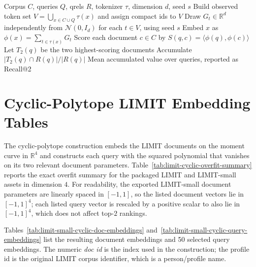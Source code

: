 \documentclass{article}
\begin{document}


\begin{algorithm}[H]
\caption{Label-unaware random token-sum retrieval}
\label{alg:random-token-limit}
\begin{algorithmic}[1]
\REQUIRE Corpus $C$, queries $Q$, qrels $R$, tokenizer $\tau$, dimension $d$, seed $s$
\STATE Build observed token set $V=\bigcup_{x\in C\cup Q}\tau(x)$ and assign compact ids to $V$
\STATE Draw $G_t\in\mathbb{R}^d$ independently from $\mathcal{N}(0,I_d)$ for each $t\in V$, using seed $s$
  \STATE Embed $x$ as $\phi(x)=\sum_{t\in\tau(x)}G_t$
\ENDFOR
{}
  \STATE Score each document $c\in C$ by $S(q,c)=\langle \phi(q),\phi(c)\rangle$
  \STATE Let $T_2(q)$ be the two highest-scoring documents
  \STATE Accumulate $\left|T_2(q)\cap R(q)\right|/\left|R(q)\right|$
\ENDFOR
\ENSURE Mean accumulated value over queries, reported as Recall@2
\end{algorithmic}
\end{algorithm}

\begin{table}[H]
  \centering
  \small
  \caption{Full random token-sum LIMIT Recall@2 grid used in
  Figure~\ref{fig:limit-retrieval}.}
  \label{tab:limit-random-token-grid}
  
\end{table}

\clearpage

\section{Cyclic-Polytope LIMIT Embedding Tables}\label{app:cyclic-limit}

The cyclic-polytope construction embeds the LIMIT documents on the
moment curve in $\mathbb{R}^4$ and constructs each query with the
squared polynomial that vanishes on its two relevant document
parameters. Table~\ref{tab:limit-cyclic-overfit-summary} reports the
exact overfit summary for the packaged LIMIT and LIMIT-small assets in
dimension $4$. For readability, the exported LIMIT-small document
parameters are linearly spaced in $[-1,1]$, so the listed document
vectors lie in $[-1,1]^4$; each listed query vector is rescaled by a
positive scalar to also lie in $[-1,1]^4$, which does not affect top-$2$
rankings.

\begin{table}[H]
  \centering
  \caption{Cyclic-polytope overfit summary for packaged LIMIT assets.}
  \label{tab:limit-cyclic-overfit-summary}
  
\end{table}
Tables~\ref{tab:limit-small-cyclic-doc-embeddings}
and~\ref{tab:limit-small-cyclic-query-embeddings} list the resulting
document embeddings and 50 selected query embeddings. The numeric
\emph{doc id} is the index used in the construction; the profile id is
the original LIMIT corpus identifier, which is a person/profile name.

\clearpage


\clearpage


\clearpage
\end{document}
